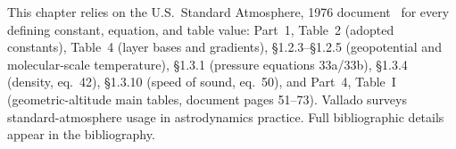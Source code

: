 This chapter relies on the U.S.~Standard Atmosphere, 1976
document~\cite{ussa1976} for every defining constant, equation, and table
value: Part~1, Table~2 (adopted constants), Table~4 (layer bases and
gradients), \S1.2.3--\S1.2.5 (geopotential and molecular-scale
temperature), \S1.3.1 (pressure equations 33a/33b), \S1.3.4 (density,
eq.~42), \S1.3.10 (speed of sound, eq.~50), and Part~4, Table~I
(geometric-altitude main tables, document pages 51--73). Vallado
\cite{vallado2013} surveys standard-atmosphere usage in astrodynamics
practice. Full bibliographic details appear in the bibliography.
